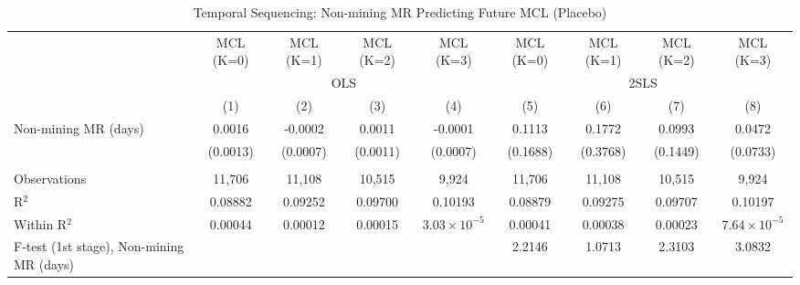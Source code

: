 
\begin{table}[htbp]
   
   \caption{\label{tab:strategic_lead_lag_placebo} Temporal Sequencing: Non-mining MR Predicting Future MCL (Placebo)}
   \bigskip
   
   \centering
   
   \begin{adjustbox}{width = \textwidth, center}
      
      
      \begin{tabular}{lcccccccc}
         \toprule
         
                                                  & MCL (K=0)     & MCL (K=1)     & MCL (K=2)     & MCL (K=3)             & MCL (K=0)     & MCL (K=1)     & MCL (K=2)     & MCL (K=3)\\  
         
          & \multicolumn{4}{c}{OLS} & \multicolumn{4}{c}{2SLS} \\ 
         
                                                  & (1)           & (2)           & (3)           & (4)                   & (5)           & (6)           & (7)           & (8)\\  
         
         \midrule 
         Non-mining MR (days)                     & 0.0016        & -0.0002       & 0.0011        & -0.0001               & 0.1113        & 0.1772        & 0.0993        & 0.0472\\   
                                                  & (0.0013)      & (0.0007)      & (0.0011)      & (0.0007)              & (0.1688)      & (0.3768)      & (0.1449)      & (0.0733)\\   
         
          \\
         
         Observations                             & 11,706        & 11,108        & 10,515        & 9,924                 & 11,706        & 11,108        & 10,515        & 9,924\\  
         R$^2$                                    & 0.08882       & 0.09252       & 0.09700       & 0.10193               & 0.08879       & 0.09275       & 0.09707       & 0.10197\\  
         Within R$^2$                             & 0.00044       & 0.00012       & 0.00015       & $3.03\times 10^{-5}$  & 0.00041       & 0.00038       & 0.00023       & $7.64\times 10^{-5}$\\   
         F-test (1st stage), Non-mining MR (days) &               &               &               &                       & 2.2146        & 1.0713        & 2.3103        & 3.0832\\  
         

\end{tabular}
\end{adjustbox}
\end{table}
